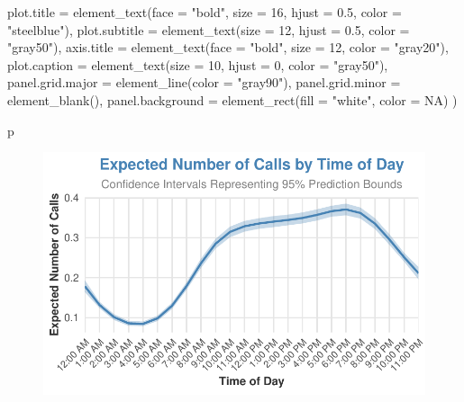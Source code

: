 \documentclass[
  letterpaper,
  DIV=11,
  numbers=noendperiod]{scrartcl}
\newenvironment{Shaded}{\begin{snugshade}}{\end{snugshade}}
\newcommand{\AttributeTok}[1]{\textcolor[rgb]{0.40,0.45,0.13}{#1}}
\newcommand{\ConstantTok}[1]{\textcolor[rgb]{0.56,0.35,0.01}{#1}}
\newcommand{\DecValTok}[1]{\textcolor[rgb]{0.68,0.00,0.00}{#1}}
\newcommand{\FloatTok}[1]{\textcolor[rgb]{0.68,0.00,0.00}{#1}}
\newcommand{\FunctionTok}[1]{\textcolor[rgb]{0.28,0.35,0.67}{#1}}
\newcommand{\NormalTok}[1]{\textcolor[rgb]{0.00,0.23,0.31}{#1}}
\newcommand{\StringTok}[1]{\textcolor[rgb]{0.13,0.47,0.30}{#1}}
\begin{document}
\begin{Shaded}
\begin{Highlighting}[]
    \AttributeTok{plot.title =} \FunctionTok{element\_text}\NormalTok{(}\AttributeTok{face =} \StringTok{"bold"}\NormalTok{, }\AttributeTok{size =} \DecValTok{16}\NormalTok{, }\AttributeTok{hjust =} \FloatTok{0.5}\NormalTok{, }\AttributeTok{color =} \StringTok{"steelblue"}\NormalTok{),}
    \AttributeTok{plot.subtitle =} \FunctionTok{element\_text}\NormalTok{(}\AttributeTok{size =} \DecValTok{12}\NormalTok{, }\AttributeTok{hjust =} \FloatTok{0.5}\NormalTok{, }\AttributeTok{color =} \StringTok{"gray50"}\NormalTok{),}
    \AttributeTok{axis.title =} \FunctionTok{element\_text}\NormalTok{(}\AttributeTok{face =} \StringTok{"bold"}\NormalTok{, }\AttributeTok{size =} \DecValTok{12}\NormalTok{, }\AttributeTok{color =} \StringTok{"gray20"}\NormalTok{),}
    \AttributeTok{plot.caption =} \FunctionTok{element\_text}\NormalTok{(}\AttributeTok{size =} \DecValTok{10}\NormalTok{, }\AttributeTok{hjust =} \DecValTok{0}\NormalTok{, }\AttributeTok{color =} \StringTok{"gray50"}\NormalTok{),}
    \AttributeTok{panel.grid.major =} \FunctionTok{element\_line}\NormalTok{(}\AttributeTok{color =} \StringTok{"gray90"}\NormalTok{),}
    \AttributeTok{panel.grid.minor =} \FunctionTok{element\_blank}\NormalTok{(),}
    \AttributeTok{panel.background =} \FunctionTok{element\_rect}\NormalTok{(}\AttributeTok{fill =} \StringTok{"white"}\NormalTok{, }\AttributeTok{color =} \ConstantTok{NA}\NormalTok{)}
\NormalTok{  )}

\NormalTok{p}
\end{Highlighting}
\end{Shaded}

\begin{figure}[H]

{\centering \includegraphics{Report_files/figure-pdf/unnamed-chunk-13-1.pdf}

}

\end{figure}
\end{document}
